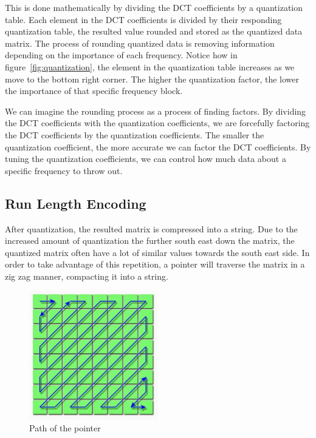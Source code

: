 \documentclass{article}
\begin{document}
This is done mathematically by dividing the DCT coefficients by a quantization table.
Each element in the DCT coefficients is divided by their responding quantization table, the resulted value rounded and stored as the quantized data matrix.
The process of rounding quantized data is removing information depending on the importance of each frequency.
Notice how in figure~\ref{fig:quantization}, the element in the quantization table increases as we move to the bottom right corner.
The higher the quantization factor, the lower the importance of that specific frequency block.

We can imagine the rounding process as a process of finding factors.
By dividing the DCT coefficients with the quantization coefficients, we are forcefully factoring the DCT coefficients by the quantization coefficients.
The smaller the quantization coefficient, the more accurate we can factor the DCT coefficients.
By tuning the quantization coefficients, we can control how much data about a specific frequency to throw out.

\subsection{Run Length Encoding}
After quantization, the resulted matrix is compressed into a string.
Due to the increased amount of quantization the further south east down the matrix, the quantized matrix often have a lot of similar values towards the south east side.
In order to take advantage of this repetition, a pointer will traverse the matrix in a zig zag manner, compacting it into a string.

\begin{figure}[h]
\begin{center}
	\includegraphics[width=0.5\textwidth]{./figures/zigzag.jpg}
\end{center}
\caption{Path of the pointer~\autocite{dctProcessing}}
\end{figure}
\end{document}
